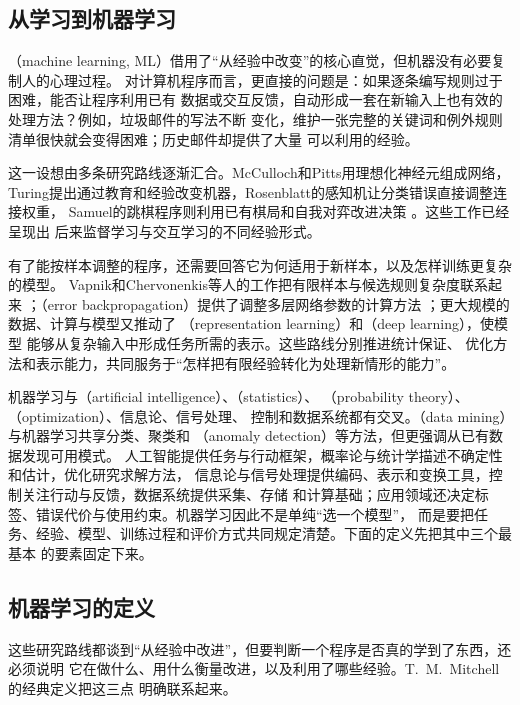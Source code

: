 \subsection{从学习到机器学习}
（machine learning, ML）借用了“从经验中改变”的核心直觉，但机器没有必要复制人的心理过程。
对计算机程序而言，更直接的问题是：如果逐条编写规则过于困难，能否让程序利用已有
数据或交互反馈，自动形成一套在新输入上也有效的处理方法？例如，垃圾邮件的写法不断
变化，维护一张完整的关键词和例外规则清单很快就会变得困难；历史邮件却提供了大量
可以利用的经验。

这一设想由多条研究路线逐渐汇合。McCulloch和Pitts用理想化神经元组成网络，
Turing提出通过教育和经验改变机器，Rosenblatt的感知机让分类错误直接调整连接权重，
Samuel的跳棋程序则利用已有棋局和自我对弈改进决策
。这些工作已经呈现出
后来监督学习与交互学习的不同经验形式。

有了能按样本调整的程序，还需要回答它为何适用于新样本，以及怎样训练更复杂的模型。
Vapnik和Chervonenkis等人的工作把有限样本与候选规则复杂度联系起来
；（error backpropagation）提供了调整多层网络参数的计算方法
；更大规模的数据、计算与模型又推动了
（representation learning）和（deep learning），使模型
能够从复杂输入中形成任务所需的表示。这些路线分别推进统计保证、
优化方法和表示能力，共同服务于“怎样把有限经验转化为处理新情形的能力”。

机器学习与（artificial intelligence）、（statistics）、
（probability theory）、（optimization）、信息论、信号处理、
控制和数据系统都有交叉。（data mining）与机器学习共享分类、聚类和
（anomaly detection）等方法，但更强调从已有数据发现可用模式。
人工智能提供任务与行动框架，概率论与统计学描述不确定性和估计，优化研究求解方法，
信息论与信号处理提供编码、表示和变换工具，控制关注行动与反馈，数据系统提供采集、存储
和计算基础；应用领域还决定标签、错误代价与使用约束。机器学习因此不是单纯“选一个模型”，
而是要把任务、经验、模型、训练过程和评价方式共同规定清楚。下面的定义先把其中三个最基本
的要素固定下来。

\subsection{机器学习的定义}

这些研究路线都谈到“从经验中改进”，但要判断一个程序是否真的学到了东西，还必须说明
它在做什么、用什么衡量改进，以及利用了哪些经验。T.~M.~Mitchell的经典定义把这三点
明确联系起来。

